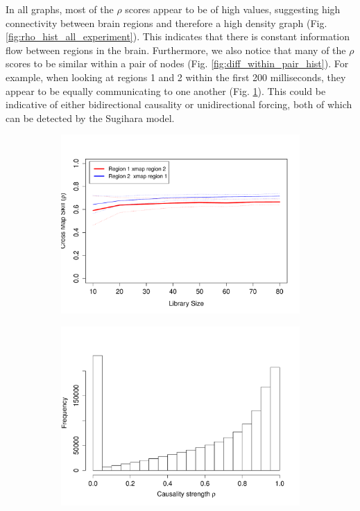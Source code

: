 In all graphs, most of the $\rho$ scores appear to be of high values, suggesting high connectivity between brain regions and therefore a high density graph (Fig. \ref{fig:rho_hist_all_experiment}). This indicates that there is constant information flow between regions in the brain. Furthermore, we also notice that many of the $\rho$ scores to be similar within a pair of nodes (Fig. \ref{fig:diff_within_pair_hist}). For example, when looking at regions 1 and 2 within the first 200 milliseconds, they appear to be equally communicating to one another (Fig. \ref{fig:sample_pair_causality_plot}). This could be indicative of either bidirectional causality or unidirectional forcing, both of which can be detected by the Sugihara model.

\begin{figure}[H]  
  \centering
  \begin{subfigure}{0.45\textwidth}
    \includegraphics[width=\linewidth]{figures/sample_pairwise_causality_measure.pdf}
    \caption{}
    \label{fig:sample_pair_causality_plot}
  \end{subfigure}
  \begin{subfigure}{0.45\textwidth}
    \centering
    \includegraphics[width=1\linewidth]{figures/rho_hist_all_experiment.pdf}

\end{subfigure}
\end{figure}

